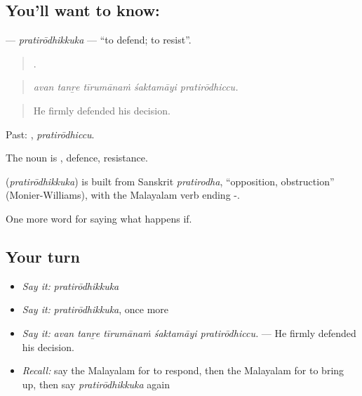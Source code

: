 \subsection*{You'll want to know: }
\textbf{} — \emph{pratirōdhikkuka} — \textquotedblleft{}to defend; to resist\textquotedblright{}.

\begin{quote}
    .
\end{quote}

\begin{quote}
\emph{avan tanṟe tīrumānaṁ śaktamāyi pratirōdhiccu.}
\end{quote}

\begin{quote}
He firmly defended his decision.
\end{quote}

Past: , \emph{pratirōdhiccu}.

The noun is , defence, resistance.

\begin{cousinweb}
\textbf{} (\emph{pratirōdhikkuka}) is built from Sanskrit \emph{pratirodha}, \textquotedblleft{}opposition, obstruction\textquotedblright{} (Monier-Williams), with the Malayalam verb ending -.
\end{cousinweb}

\begin{grammarlens}[title={What you've built}]
One more word for saying what happens if.
\end{grammarlens}

\subsection*{Your turn}
\begin{itemize}
\raggedright
  \item \emph{Say it:} \emph{pratirōdhikkuka}
  \item \emph{Say it:} \emph{pratirōdhikkuka}, once more
  \item \emph{Say it:} \emph{avan tanṟe tīrumānaṁ śaktamāyi pratirōdhiccu.} — He firmly defended his decision.
  \item \emph{Recall:} say the Malayalam for to respond, then the Malayalam for to bring up, then say \emph{pratirōdhikkuka} again
\end{itemize}

